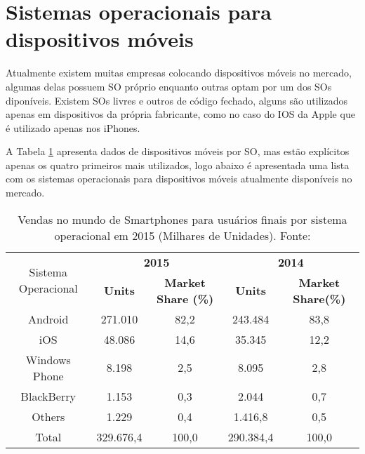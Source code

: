 \section{Sistemas operacionais para dispositivos móveis}
Atualmente existem muitas empresas colocando dispositivos móveis no mercado, algumas delas possuem SO próprio enquanto outras optam por um dos SOs diponíveis.
Existem SOs livres e outros de código fechado, alguns são utilizados apenas em dispositivos da própria fabricante, como no caso do IOS da Apple que é utilizado apenas nos iPhones.

A Tabela \ref{tab:OS} apresenta dados de dispositivos móveis por SO, mas estão explícitos apenas os quatro primeiros mais utilizados, logo abaixo é apresentada uma lista com os sistemas operacionais para dispositivos móveis atualmente disponíveis no mercado.

\begin{table}[ph]
	\footnotesize
	\centering
	\caption[Sistemas operacionais mais utilizados]{Vendas no mundo de Smartphones para usuários finais por sistema operacional em 2015 (Milhares de Unidades). Fonte: \cite{gartner}}
	\begin{tabular}{|*5{c|}}
		\hline
		\multirow{2}{*}{Sistema Operacional} & \multicolumn{2}{|c|}{\textbf{2015}} & \multicolumn{2}{|c|}{\textbf{2014}}\\ \hhline{~----}
		 & \textbf{Units}  & \textbf{Market Share (\%)} & \textbf{Units}  & \textbf{Market Share(\%)}\\ \hline \SPACE
		Android & 271.010 & 82,2 & 243.484 & 83,8\\ \hline \SPACE
		iOS & 48.086 & 14,6 & 35.345 & 12,2\\ \hline \SPACE
		Windows Phone & 8.198 & 2,5 & 8.095 & 2,8\\ \hline \SPACE
		BlackBerry & 1.153 & 0,3 & 2.044 & 0,7\\ \hline \SPACE
		Others & 1.229 & 0,4 & 1.416,8 & 0,5\\ \hline \SPACE
		Total & 329.676,4 & 100,0 & 290.384,4 & 100,0\\
		\hline
	\end{tabular}
	\label{tab:OS}
\end{table}

